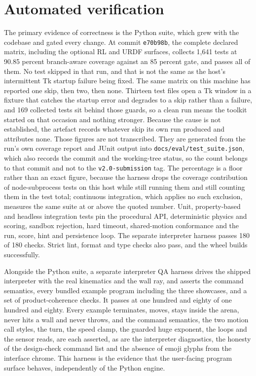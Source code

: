 \documentclass[11pt,a4paper]{report}
\begin{document}
\section{Automated verification}
\label{sec:autoverify}
The primary evidence of correctness is the Python suite, which grew with the codebase and gated every change. At commit \texttt{e70b98b}, the complete declared matrix, including the optional RL and URDF surfaces, collects 1,641 tests at 90.85 percent branch-aware coverage against an 85 percent gate, and passes all of them. No test skipped in that run, and that is not the same as the host's intermittent Tk startup failure being fixed. The same matrix on this machine has reported one skip, then two, then none. Thirteen test files open a Tk window in a fixture that catches the startup error and degrades to a skip rather than a failure, and 169 collected tests sit behind those guards, so a clean run means the toolkit started on that occasion and nothing stronger. Because the cause is not established, the artefact records whatever skip its own run produced and attributes none. Those figures are not transcribed. They are generated from the run's own coverage report and JUnit output into \texttt{docs/eval/test\_suite.json}, which also records the commit and the working-tree status, so the count belongs to that commit and not to the \texttt{v2.0-submission} tag. The percentage is a floor rather than an exact figure, because the harness drops the coverage contribution of node-subprocess tests on this host while still running them and still counting them in the test total; continuous integration, which applies no such exclusion, measures the same suite at or above the quoted number. Unit, property-based and headless integration tests pin the procedural API, deterministic physics and scoring, sandbox rejection, hard timeout, shared-motion conformance and the run, score, hint and persistence loop. The separate interpreter harness passes 180 of 180 checks. Strict lint, format and type checks also pass, and the wheel builds successfully.

Alongside the Python suite, a separate interpreter QA harness drives the shipped interpreter with the real kinematics and the wall ray, and asserts the command semantics, every bundled example program including the three showcases, and a set of product-coherence checks. It passes at one hundred and eighty of one hundred and eighty. Every example terminates, moves, stays inside the arena, never hits a wall and never throws, and the command semantics, the two motion call styles, the turn, the speed clamp, the guarded huge exponent, the loops and the sensor reads, are each asserted, as are the interpreter diagnostics, the honesty of the design-check command list and the absence of emoji glyphs from the interface chrome. This harness is the evidence that the user-facing program surface behaves, independently of the Python engine.
\end{document}
